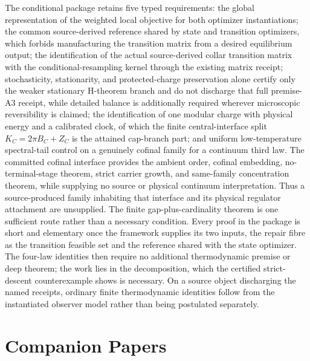 \documentclass[11pt]{article}
\begin{document}
The conditional package retains five typed requirements: the global
representation of the weighted local objective for both optimizer
instantiations; the common source-derived reference shared by state and
transition optimizers, which forbids manufacturing the transition
matrix from a desired equilibrium output; the identification of the
actual source-derived collar transition matrix with the
conditional-resampling kernel through the existing matrix receipt;
stochasticity, stationarity, and protected-charge preservation alone
certify only the weaker stationary H-theorem branch and do not discharge
that full premise-A3 receipt, while detailed balance is additionally required
wherever microscopic reversibility is claimed; the
identification of one modular charge with physical energy and a
calibrated clock, of which the finite central-interface split
\(K_C=2\pi B_C+Z_C\) is the attained cap-branch part; and
uniform low-temperature spectral-tail control on a genuinely cofinal family
for a continuum third law. The committed cofinal interface provides the
ambient order, cofinal embedding, no-terminal-stage theorem, strict carrier
growth, and same-family concentration theorem, while supplying no source or
physical continuum interpretation. Thus a source-produced family inhabiting
that interface and its physical regulator attachment are unsupplied. The finite
gap-plus-cardinality theorem is one sufficient route rather than a
necessary condition. Every
proof in the package is short and elementary once the framework
supplies its two inputs, the repair fibre as the transition feasible
set and the reference shared with the state optimizer. The four-law
identities then require no additional thermodynamic premise or deep theorem;
the work lies in the decomposition, which the certified strict-descent
counterexample shows is necessary. On a source object discharging the named receipts,
ordinary finite thermodynamic identities follow from the instantiated
observer model rather than being postulated separately.





\section*{Companion Papers}
\end{document}
